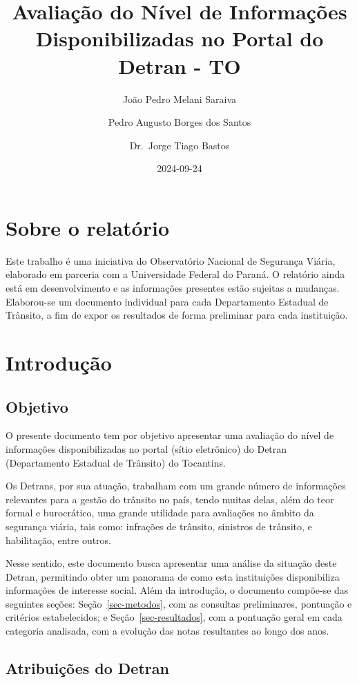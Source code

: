 \documentclass[
  a4paper,
]{article}
\title{Avaliação do Nível de Informações Disponibilizadas no Portal do
Detran - TO}
\author[1]{João Pedro Melani Saraiva}
\author[1]{Pedro Augusto Borges dos Santos}
\author[2]{Dr.~Jorge Tiago Bastos}
\affil[1]{Observatório Nacional de Segurança Viária}
\affil[2]{Universidade Federal do Paraná}
\date{2024-09-24}
\begin{document}
\maketitle

\section{Sobre o relatório}\label{sobre-o-relatuxf3rio}

Este trabalho é uma iniciativa do Observatório Nacional de Segurança
Viária, elaborado em parceria com a Universidade Federal do Paraná. O
relatório ainda está em desenvolvimento e as informações presentes estão
sujeitas a mudanças. Elaborou-se um documento individual para cada
Departamento Estadual de Trânsito, a fim de expor os resultados de forma
preliminar para cada instituição.

\section{Introdução}\label{introduuxe7uxe3o}

\subsection{Objetivo}\label{objetivo}

O presente documento tem por objetivo apresentar uma avaliação do nível
de informações disponibilizadas no portal (sítio eletrônico) do Detran
(Departamento Estadual de Trânsito) do Tocantins.

Os Detrans, por sua atuação, trabalham com um grande número de
informações relevantes para a gestão do trânsito no país, tendo muitas
delas, além do teor formal e burocrático, uma grande utilidade para
avaliações no âmbito da segurança viária, tais como: infrações de
trânsito, sinistros de trânsito, e habilitação, entre outros.

Nesse sentido, este documento busca apresentar uma análise da situação
deste Detran, permitindo obter um panorama de como esta instituições
disponibiliza informações de interesse social. Além da introdução, o
documento compõe-se das seguintes seções: Seção~\ref{sec-metodos}, com
as consultas preliminares, pontuação e critérios estabelecidos; e
Seção~\ref{sec-resultados}, com a pontuação geral em cada categoria
analisada, com a evolução das notas resultantes ao longo dos anos.

\subsection{Atribuições do Detran}\label{atribuiuxe7uxf5es-do-detran}
\end{document}
